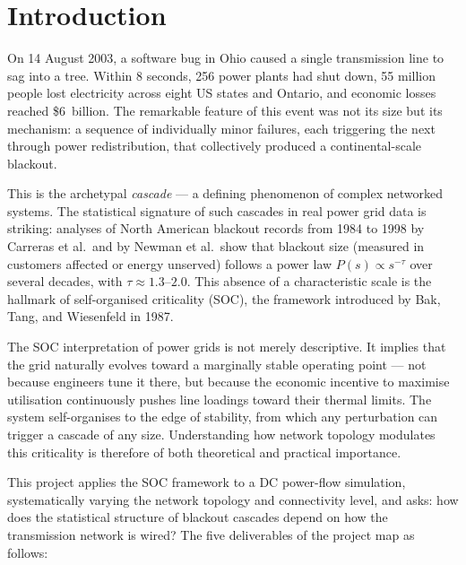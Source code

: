 \documentclass[12pt,a4paper]{article}
\begin{document}
\section*{Introduction}

On 14 August 2003, a software bug in Ohio caused a single transmission
line to sag into a tree. Within 8 seconds, 256 power plants had shut
down, 55 million people lost electricity across eight US states and
Ontario, and economic losses reached \$6~billion. The remarkable feature
of this event was not its size but its mechanism: a sequence of
individually minor failures, each triggering the next through power
redistribution, that collectively produced a continental-scale blackout.

This is the archetypal \emph{cascade} — a defining phenomenon of complex
networked systems. The statistical signature of such cascades in real
power grid data is striking: analyses of North American blackout records
from 1984 to 1998 by Carreras et al.\ and by Newman et al.\ show that
blackout size (measured in customers affected or energy unserved) follows
a power law $P(s) \propto s^{-\tau}$ over several decades, with
$\tau \approx 1.3$--$2.0$. This absence of a characteristic scale is the
hallmark of self-organised criticality (SOC), the framework introduced by
Bak, Tang, and Wiesenfeld in 1987.

The SOC interpretation of power grids is not merely descriptive. It
implies that the grid naturally evolves toward a marginally stable
operating point — not because engineers tune it there, but because the
economic incentive to maximise utilisation continuously pushes line
loadings toward their thermal limits. The system self-organises to the
edge of stability, from which any perturbation can trigger a cascade of
any size. Understanding how network topology modulates this criticality
is therefore of both theoretical and practical importance.

This project applies the SOC framework to a DC power-flow simulation,
systematically varying the network topology and connectivity level, and
asks: how does the statistical structure of blackout cascades depend on
how the transmission network is wired? The five deliverables of the
project map as follows:
\end{document}

